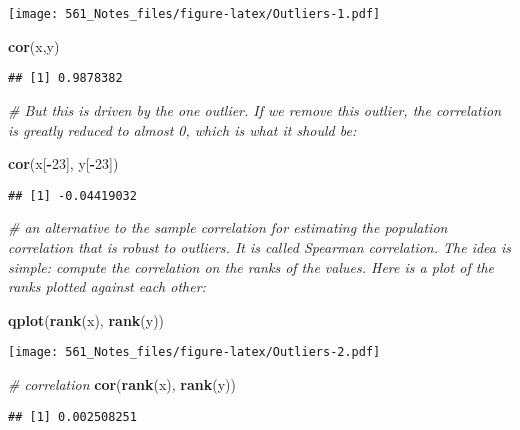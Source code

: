 \documentclass[]{article}
\newenvironment{Shaded}{\begin{snugshade}}{\end{snugshade}}
\newcommand{\CommentTok}[1]{\textcolor[rgb]{0.56,0.35,0.01}{\textit{#1}}}
\newcommand{\DecValTok}[1]{\textcolor[rgb]{0.00,0.00,0.81}{#1}}
\newcommand{\KeywordTok}[1]{\textcolor[rgb]{0.13,0.29,0.53}{\textbf{#1}}}
\newcommand{\NormalTok}[1]{#1}
\newcommand{\OperatorTok}[1]{\textcolor[rgb]{0.81,0.36,0.00}{\textbf{#1}}}
\begin{document}
\texttt{[image: 561\_Notes\_files/figure-latex/Outliers-1.pdf]}

\begin{Shaded}
\begin{Highlighting}[]
\KeywordTok{cor}\NormalTok{(x,y)}
\end{Highlighting}
\end{Shaded}

\begin{verbatim}
## [1] 0.9878382
\end{verbatim}

\begin{Shaded}
\begin{Highlighting}[]
\CommentTok{# But this is driven by the one outlier. If we remove this outlier, the correlation is greatly reduced to almost 0, which is what it should be:}

\KeywordTok{cor}\NormalTok{(x[}\OperatorTok{-}\DecValTok{23}\NormalTok{], y[}\OperatorTok{-}\DecValTok{23}\NormalTok{])}
\end{Highlighting}
\end{Shaded}

\begin{verbatim}
## [1] -0.04419032
\end{verbatim}

\begin{Shaded}
\begin{Highlighting}[]
\CommentTok{# an alternative to the sample correlation for estimating the population correlation that is robust to outliers. It is called Spearman correlation. The idea is simple: compute the correlation on the ranks of the values. Here is a plot of the ranks plotted against each other:}

\KeywordTok{qplot}\NormalTok{(}\KeywordTok{rank}\NormalTok{(x), }\KeywordTok{rank}\NormalTok{(y))}
\end{Highlighting}
\end{Shaded}

\texttt{[image: 561\_Notes\_files/figure-latex/Outliers-2.pdf]}

\begin{Shaded}
\begin{Highlighting}[]
\CommentTok{# correlation}
\KeywordTok{cor}\NormalTok{(}\KeywordTok{rank}\NormalTok{(x), }\KeywordTok{rank}\NormalTok{(y))}
\end{Highlighting}
\end{Shaded}

\begin{verbatim}
## [1] 0.002508251
\end{verbatim}
\end{document}
